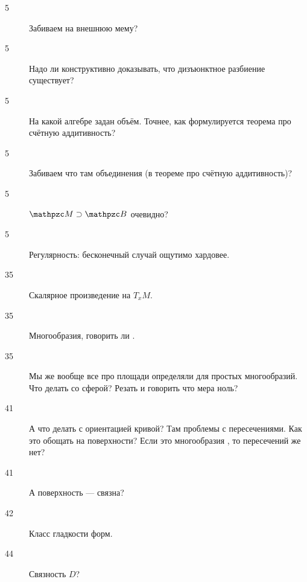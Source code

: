 \documentclass[timbord]{longnotes}
\begin{document}
\begin{description}
  \item[5] Забиваем на внешнюю мему?
  \item[5] Надо ли конструктивно доказывать, что дизъюнктное разбиение существует?
  \item[5] На какой алгебре задан объём. Точнее, как формулируется теорема про счётную аддитивность?
  \item[5] Забиваем что там объединения (в теореме про счётную аддитивность)?
  \item[5] $\lebesgue \supset \borel$ очевидно? 
  \item[5] Регулярность: бесконечный случай ощутимо хардовее.
  \item[35] Скалярное произведение на $T_xM$.
  \item[35] Многообразия, говорить ли .
  \item[35] Мы же вообще все про площади определяли для простых многообразий.
    Что делать со сферой? Резать и говорить что мера ноль?
  \item[41] А что делать с ориентацией кривой? Там проблемы с пересечениями. 
    Как это обощать на поверхности? Если это многообразия , то пересечений же нет?
  \item[41] А поверхность --- связна?
  \item[42] Класс гладкости форм.
  \item[44] Связность $D$? 
\end{description}
\end{document}
